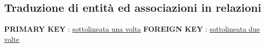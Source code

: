 
\newpage

\subsection{Traduzione di entità ed associazioni in relazioni}


\centering
\textsf{\small \textbf{PRIMARY KEY} : \underline{sottolineata una volta}}
\textsf{\small \textbf{FOREIGN KEY} : \underline{\underline{sottolineata due volte}}}\\


